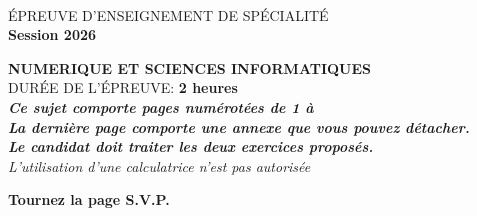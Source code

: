 \pagestyle{empty}

\NomPrenom{}

\vspace{1cm}

\begin{center}
\\
\vspace{3cm}
{\Large \'EPREUVE D'ENSEIGNEMENT DE SP\'ECIALIT\'E}\\
\vspace{3cm}\Large\bf{Session 2026}\\
\vspace{2cm}

{\LARGE {\bf NUMERIQUE ET SCIENCES INFORMATIQUES}}\\
\vspace{1.5cm}
\vspace{1.5cm}
DUR\'EE DE L'\'EPREUVE: {\bf 2 heures} \\
\vspace{2cm}
{\bf {\it Ce sujet comporte \pageref{LastPage} pages numérotées de 1 à \pageref{LastPage}}}\\
{\bf {\it La dernière page comporte une annexe que vous pouvez détacher.}}\\
{\bf {\it Le candidat doit traiter les deux exercices proposés.}}\\
   \vspace{1.5cm}
{\it L'utilisation d'une calculatrice n'est pas autorisée}\\
\vspace{1.5cm}
\end{center}
\vfill
\hfill {\bf Tournez la page S.V.P.}
